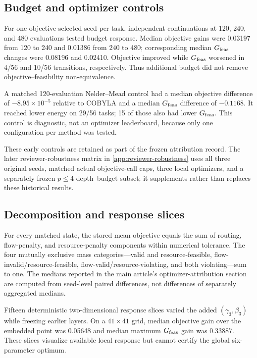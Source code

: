 \subsection{Budget and optimizer controls}

For one objective-selected seed per task, independent continuations at 120,
240, and 480 evaluations tested budget response. Median objective gains were
0.03197 from 120 to 240 and 0.01386 from 240 to 480; corresponding median
$G_{\mathrm{feas}}$ changes were 0.08196 and 0.02410. Objective improved while
$G_{\mathrm{feas}}$ worsened in 4/56 and 10/56 transitions, respectively. Thus additional
budget did not remove objective--feasibility non-equivalence.

A matched 120-evaluation Nelder--Mead control had a median objective difference
of $-8.95\times10^{-5}$ relative to COBYLA and a median $G_{\mathrm{feas}}$ difference of
$-0.1168$. It reached lower energy on 29/56 tasks; 15 of those also had lower
$G_{\mathrm{feas}}$. This control is diagnostic, not an optimizer leaderboard, because
only one configuration per method was tested.

These early controls are retained as part of the frozen attribution record.
The later reviewer-robustness matrix in \cref{app:reviewer-robustness} uses
all three original seeds, matched actual objective-call caps, three local
optimizers, and a separately frozen $p\leq4$ depth--budget subset; it
supplements rather than replaces these historical results.

\subsection{Decomposition and response slices}

For every matched state, the stored mean objective equals the sum of routing,
flow-penalty, and resource-penalty components within numerical tolerance. The
four mutually exclusive mass categories---valid and resource-feasible,
flow-invalid/resource-feasible, flow-valid/resource-violating, and both
violating---sum to one. The medians reported in the main article's
optimizer-attribution section are
computed from seed-level paired differences, not differences of separately
aggregated medians.

Fifteen deterministic two-dimensional response slices varied the added
$(\gamma_3,\beta_3)$ while freezing earlier layers. On a $41\times41$ grid,
median objective gain over the embedded point was 0.05648 and median maximum
$G_{\mathrm{feas}}$ gain was 0.33887. These slices visualize available local response but
cannot certify the global six-parameter optimum.
